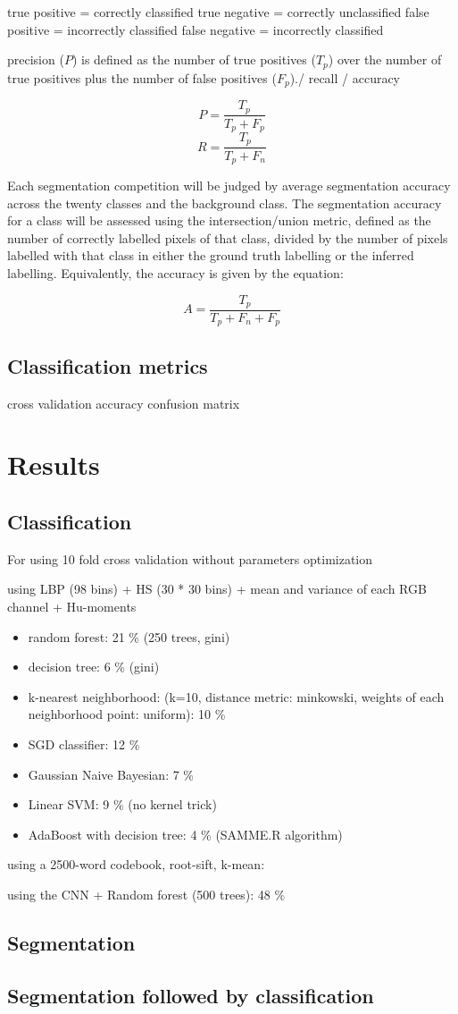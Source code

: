 true positive = correctly classified
true negative = correctly unclassified
false positive = incorrectly classified
false negative = incorrectly classified

precision ($P$)  is defined as the number of true positives ($T_p$) over the number of true positives plus the number of false positives ($F_p$)./ recall / accuracy

$$ P =  \frac{T_p}{T_p + F_p}$$
$$ R =  \frac{T_p}{T_p + F_n}$$

Each segmentation competition will be judged by average segmentation accuracy across the twenty classes and the background class. The segmentation accuracy for a class will be assessed using the intersection/union metric, defined as the number of correctly labelled pixels of that class, divided by the number of pixels labelled with that class in either the ground truth labelling or the inferred labelling. Equivalently, the accuracy is given by the equation:

$$ A = \frac{T_p}{T_p + F_n + F_p} $$

\subsection{Classification metrics}

cross validation
accuracy
confusion matrix

\section{Results}
\subsection{Classification}

For using 10 fold cross validation
without parameters optimization

using LBP (98 bins) + HS (30 * 30 bins) + mean and variance of each RGB channel + Hu-moments
\begin{itemize}
    \item random forest: 21 \% (250 trees, gini)
    \item decision tree: 6 \% (gini)
    \item k-nearest neighborhood: (k=10, distance metric: minkowski, weights of each neighborhood point: uniform): 10 \%
    \item SGD classifier:  12 \%
    \item Gaussian Naive Bayesian: 7 \%
    \item Linear SVM: 9 \% (no kernel trick)
    \item AdaBoost with decision tree: 4 \% (SAMME.R algorithm)
\end{itemize}

using a 2500-word codebook, root-sift, k-mean: 

using the CNN + Random forest (500 trees): 48 \%

\subsection{Segmentation}


\subsection{Segmentation followed by classification}
